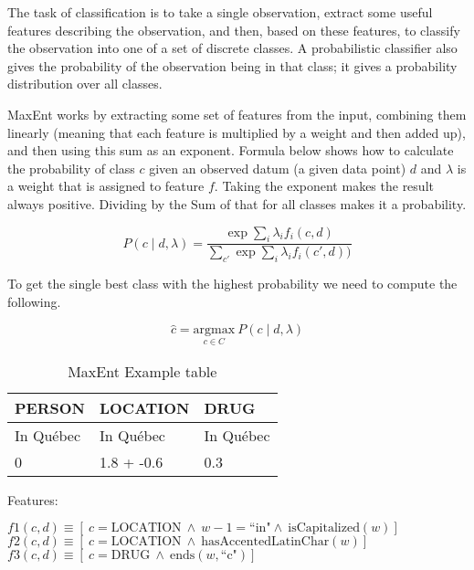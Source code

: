 The task of classification is to take a single observation, extract some useful features describing the observation, and then, based on these features, to classify the observation into one of a set of discrete classes. A probabilistic classifier also gives the probability of the observation being in that class; it gives a probability distribution over all classes.

MaxEnt works by extracting some set of features from the input, combining them linearly (meaning that each feature is multiplied by a weight and then added up), and then using this sum as an exponent.
Formula below shows how to calculate the probability of class $c$ given an observed datum (a given data point) $d$ and $\lambda$ is a weight that is assigned to feature $f$. Taking the exponent makes the result always positive. Dividing by the Sum of that for all classes makes it a probability.

\begin{equation}
  P(c \mid d, \lambda) = \frac{\exp\sum_i\lambda_i f_i (c,d)}{\sum_{c\prime}\exp\sum_{i}\lambda_i f_i (c\prime,d))}
  \label{eq:pcdlambda}
\end{equation}

To get the single best class with the highest probability we need to compute the following.

\begin{equation}
  \hat{c} = \underset{c\in C}{\text{argmax}} \ P(c \mid d,\lambda)
  \label{eq:hatc}
\end{equation}

\begin{table}[htb]
  \centering
  \begin{tabu}{lll}
  \toprule
  PERSON    & LOCATION   & DRUG      \\ \midrule
  In Québec & In Québec  & In Québec \\
  0         & 1.8 + -0.6 & 0.3       \\
  \bottomrule
  \end{tabu}
\caption[MaxEnt Example table]{MaxEnt Example table}
\label{tab:maxent}
\end{table}

Features:

$f1(c,d) \equiv [ \ c = \text{LOCATION} \ \wedge \ w-1 = \text{``in"} \wedge \ \text{isCapitalized}(w)]$\\
$f2(c,d) \equiv [ \ c = \text{LOCATION} \ \wedge \ \text{hasAccentedLatinChar}(w)]$\\
$f3(c,d) \equiv [ \ c = \text{DRUG} \ \wedge \ \text{ends}(w,\text{``c"})]$

